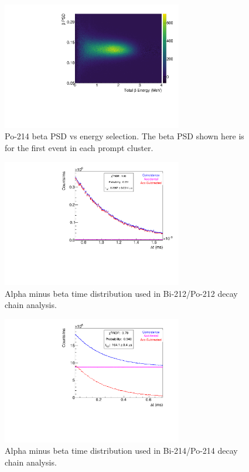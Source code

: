 \begin{figure}[!b]
\centering
\includegraphics[width=0.7\textwidth]{figures/BiPo214BetaPSDvsE.pdf}
\caption{\label{fig:bpsd214}Po-214 beta PSD vs energy selection. The beta PSD shown here is for the first event in each prompt cluster.}
\end{figure}
\begin{figure}[!b]
\centering
\includegraphics[width=0.7\textwidth]{figures/BiPo212DeltaTSpectrum.pdf}
\caption{\label{fig:dt212}Alpha minus beta time distribution used in Bi-212/Po-212 decay chain analysis. }
\end{figure}

\begin{figure}[!bp]
\centering
\includegraphics[width=0.7\textwidth]{figures/BiPo214DeltaTSpectrum.pdf}
\caption{\label{fig:dt214}Alpha minus beta time distribution used in Bi-214/Po-214 decay chain analysis.}
\end{figure}
\clearpage
\newpage

